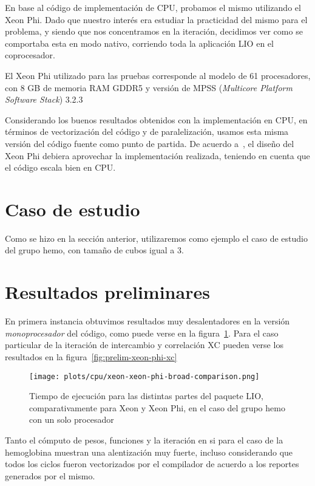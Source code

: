En base al c\'odigo de implementaci\'on de CPU, probamos el mismo
utilizando el Xeon Phi. Dado que nuestro inter\'es era estudiar la
practicidad del mismo para el problema, y siendo que nos concentramos
en la iteraci\'on, decidimos ver como se comportaba esta en modo
nativo, corriendo toda la aplicaci\'on LIO en el coprocesador.

El Xeon Phi utilizado para las pruebas corresponde al modelo de
61 procesadores, con 8 GB de memoria RAM GDDR5 y versi\'on de MPSS
(\textit{Multicore Platform Software Stack}) 3.2.3

Considerando los buenos resultados obtenidos con la implementaci\'on
en CPU, en t\'erminos de vectorizaci\'on del c\'odigo y de paralelizaci\'on,
usamos esta misma versi\'on del c\'odigo fuente como punto de partida. De
acuerdo a~\cite{Jeffers}, el dise\~no del Xeon Phi debiera aprovechar la
implementaci\'on realizada, teniendo en cuenta que el c\'odigo escala bien
en CPU.

\section{Caso de estudio}

Como se hizo en la secci\'on anterior, utilizaremos como ejemplo el caso de
estudio del grupo hemo, con tama\~no de cubos igual a 3.

\section{Resultados preliminares}

En primera instancia obtuvimos resultados muy desalentadores en la versi\'on
\textit{monoprocesador} del c\'odigo, como puede verse en la figura~\ref{fig:prelim-xeon-phi}.
Para el caso particular de la iteraci\'on de intercambio y correlaci\'on XC pueden
verse los resultados en la figura~\ref{fig:prelim-xeon-phi-xc}

\begin{figure}[htbp]
   \centering
   \texttt{[image: plots/cpu/xeon-xeon-phi-broad-comparison.png]}
   \caption{Tiempo de ejecuci\'on para las distintas partes del paquete LIO,
   comparativamente para Xeon y Xeon Phi, en el caso del grupo hemo con un solo procesador}
   \label{fig:prelim-xeon-phi}
\end{figure}

Tanto el c\'omputo de pesos, funciones y la iteraci\'on en si para el caso de la
hemoglobina muestran una alentizaci\'on muy fuerte, incluso considerando que
todos los ciclos fueron vectorizados por el compilador de acuerdo a los reportes
generados por el mismo.

